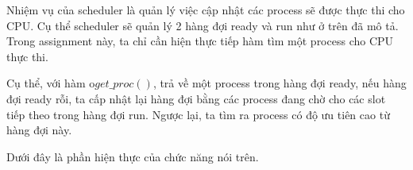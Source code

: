 Nhiệm vụ của scheduler là quản lý việc cập nhật các process sẽ được thực thi cho CPU. Cụ thể scheduler sẽ quản lý 2 hàng đợi ready và run như ở trên đã mô tả. Trong assignment này, ta chỉ cần hiện thực tiếp hàm tìm một process cho CPU thực thi.

Cụ thể, với hàm o$ get\_proc() $, trả về một process trong hàng đợi ready, nếu hàng đợi ready rỗi, ta cấp nhật lại hàng đợi bằng các process đang chờ cho các slot tiếp theo trong hàng đợi run. Ngược lại, ta tìm ra process có độ ưu tiên cao từ hàng đợi này.

Dưới đây là phần hiện thực của chức năng nói trên.

